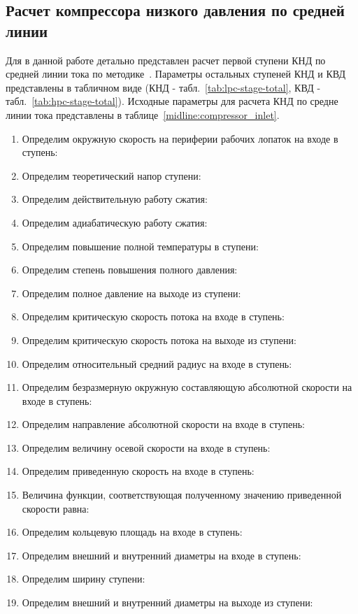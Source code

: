 \subsection{Расчет компрессора низкого давления по средней линии}

Для в данной работе детально представлен расчет первой ступени КНД по средней линии тока по методике~\cite{beknev}.
Параметры остальных ступеней КНД и КВД представлены в табличном виде
(КНД - табл.~\ref{tab:lpc-stage-total}, КВД - табл.~\ref{tab:hpc-stage-total}).
Исходные параметры для расчета КНД по средне линии тока представлены в таблице~\ref{midline:compressor_inlet}.


\begin{enumerate}
	\item Определим окружную скорость на периферии рабочих лопаток на входе в ступень:
	\item Определим теоретический напор ступени:
	\item Определим действительную работу сжатия:
	\item Определим адиабатическую работу сжатия:
	\item Определим повышение полной температуры в ступени:
	\item Определим степень повышения полного давления:
	\item Определим полное давление на выходе из ступени:
	\item Определим критическую скорость потока на входе в ступень:
	\item Определим критическую скорость потока на выходе из ступени:
	\item Определим относительный средний радиус на входе в ступень:
	\item Определим безразмерную окружную составляющую абсолютной скорости на входе в ступень:
	\item Определим направление абсолютной скорости на входе в ступень:
	\item Определим величину осевой скорости на входе в ступень:
	\item Определим приведенную скорость на входе в ступень:
	\item Величина функции, соответствующая полученному значению приведенной скорости равна:
	\item Определим кольцевую площадь на входе в ступень:
	\item Определим внешний и внутренний диаметры на входе в ступень:
	\item Определим ширину ступени:
	\item Определим внешний и внутренний диаметры на выходе из ступени:

\end{enumerate}
